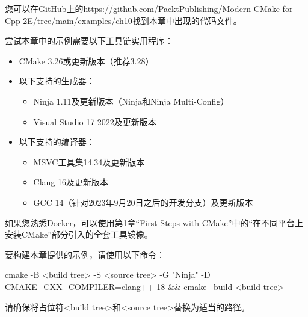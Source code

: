 您可以在GitHub上的\url{https://github.com/PacktPublishing/Modern-CMake-for-Cpp-2E/tree/main/examples/ch10}找到本章中出现的代码文件。

尝试本章中的示例需要以下工具链实用程序：


\begin{itemize}
\item
CMake 3.26或更新版本（推荐3.28）

\item
以下支持的生成器：
\begin{itemize}
\item
Ninja 1.11及更新版本（Ninja和Ninja Multi-Config）

\item
Visual Studio 17 2022及更新版本
\end{itemize}

\item
以下支持的编译器：
\begin{itemize}
\item
MSVC工具集14.34及更新版本

\item
Clang 16及更新版本

\item
GCC 14（针对2023年9月20日之后的开发分支）及更新版本
\end{itemize}
\end{itemize}

如果您熟悉Docker，可以使用第1章“First Steps with CMake”中的“在不同平台上安装CMake”部分引入的全套工具镜像。

要构建本章提供的示例，请使用以下命令：

\begin{shell}
cmake -B <build tree> -S <source tree> -G "Ninja" -D CMAKE_CXX_COMPILER=clang++-18 && cmake --build <build tree>
\end{shell}

请确保将占位符<build tree>和<source tree>替换为适当的路径。












